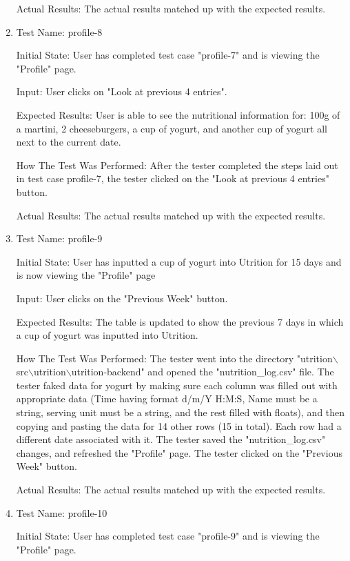 \documentclass[12pt, titlepage]{article}
\begin{document}
\begin{enumerate}
		Actual Results: The actual results matched up with the expected results.
		
		\item{Test Name: profile-8}
		
		Initial State: User has completed test case "profile-7" and is viewing the "Profile" page.
		
		Input: User clicks on "Look at previous 4 entries".
		
		Expected Results: User is able to see the nutritional information for: 100g of a martini, 2 cheeseburgers, a cup of yogurt, and another cup of yogurt all next to the current date.
		
		How The Test Was Performed: After the tester completed the steps laid out in test case profile-7, the tester clicked on the "Look at previous 4 entries" button.
		
		Actual Results: The actual results matched up with the expected results.
		
		\item{Test Name: profile-9}
		
		Initial State: User has inputted a cup of yogurt into Utrition for 15 days and is now viewing the "Profile" page
		
		Input: User clicks on the "Previous Week" button.
		
		Expected Results: The table is updated to show the previous 7 days in which a cup of yogurt was inputted into Utrition. 
		
		How The Test Was Performed: The tester went into the directory "utrition$\backslash$src$\backslash$utrition$\backslash$utrition-backend" and opened the "nutrition\_log.csv" file. The tester faked data for yogurt by making sure each column was filled out with appropriate data (Time having format d/m/Y H:M:S, Name must be a string, serving unit must be a string, and the rest filled with floats), and then copying and pasting the data for 14 other rows (15 in total). Each row had a different date associated with it. The tester saved the "nutrition\_log.csv" changes, and refreshed the "Profile" page. The tester clicked on the "Previous Week" button.
		
		Actual Results: The actual results matched up with the expected results.
		
		\item{Test Name: profile-10}
		
		Initial State: User has completed test case "profile-9" and is viewing the "Profile" page.
		

\end{enumerate}
\end{document}
